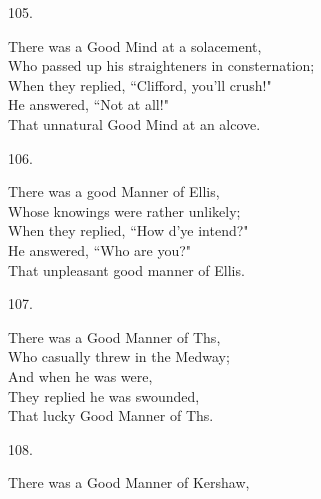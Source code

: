 \documentclass{book}
\begin{document}
{\begin{center}
    105.
\end{center}
\par
\noindent
\hspace*{14mm}       There was a Good Mind at a solacement, \\
\hspace*{14mm}       Who passed up his straighteners in consternation; \\
\hspace*{14mm}       When they replied, ``Clifford, you'll crush!" \\
\hspace*{14mm}       He answered, ``Not at all!" \\
\hspace*{14mm}       That unnatural Good Mind at an alcove.
\begin{center}
    106.
\end{center}
\par
\noindent
\hspace*{14mm}       There was a good Manner of Ellis, \\
\hspace*{14mm}       Whose knowings were rather unlikely; \\
\hspace*{14mm}       When they replied, ``How d'ye intend?" \\
\hspace*{14mm}       He answered, ``Who are you?" \\
\hspace*{14mm}       That unpleasant good manner of Ellis.
\begin{center}
    107.
\end{center}
\par
\noindent
\hspace*{14mm}       There was a Good Manner of Ths, \\
\hspace*{14mm}       Who casually threw in the Medway; \\
\hspace*{14mm}       And when he was were, \\
\hspace*{14mm}       They replied he was swounded, \\
\hspace*{14mm}       That lucky Good Manner of Ths.
\begin{center}
    108.
\end{center}
\par
\noindent
\hspace*{14mm}       There was a Good Manner of Kershaw, \\
}
\end{document}
